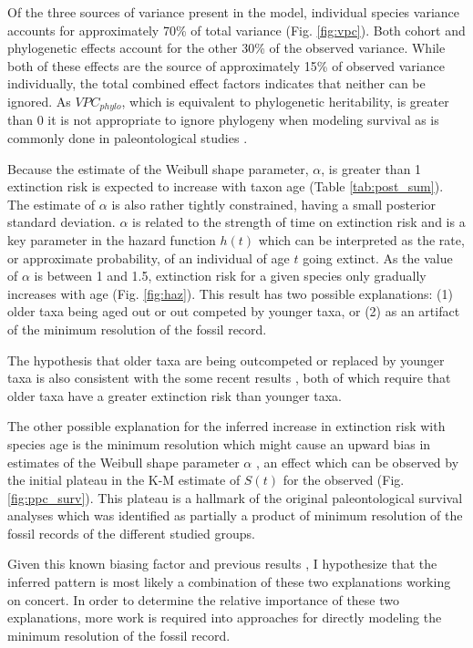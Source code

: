 \documentclass{nature}
\begin{document}
Of the three sources of variance present in the model, individual species variance accounts for approximately 70\% of total variance (Fig. \ref{fig:vpc}). Both cohort and phylogenetic effects account for the other 30\% of the observed variance. While both of these effects are the source of approximately 15\% of observed variance individually, the total combined effect factors indicates that neither can be ignored. As \(VPC_{phylo}\), which is equivalent to phylogenetic heritability, is greater than 0 it is not appropriate to ignore phylogeny when modeling survival \cite{Housworth2004} as is commonly done in paleontological studies \cite{Alroy2009,Foote2013,Jablonski2006a,Hunt2007a,Liow2008,Payne2007}. 

Because the estimate of the Weibull shape parameter, \(\alpha\), is greater than 1 extinction risk is expected to increase with taxon age (Table \ref{tab:post_sum}). The estimate of \(\alpha\) is also rather tightly constrained, having a small posterior standard deviation. \(\alpha\) is related to the strength of time on extinction risk and is a key parameter in the hazard function \(h(t)\) which can be interpreted as the rate, or approximate probability, of an individual of age \(t\) going extinct. As the value of \(\alpha\) is between 1 and 1.5, extinction risk for a given species only gradually increases with age (Fig. \ref{fig:haz}). This result has two possible explanations: (1) older taxa being aged out or out competed by younger taxa, or (2) as an artifact of the minimum resolution of the fossil record.

The hypothesis that older taxa are being outcompeted or replaced by younger taxa is also consistent with the some recent results \cite{Wagner2014b,Quental2013}, both of which require that older taxa have a greater extinction risk than younger taxa.

The other possible explanation for the inferred increase in extinction risk with species age is the minimum resolution which might cause an upward bias in estimates of the Weibull shape parameter \(\alpha\) \cite{Sepkoski1975}, an effect which can be observed by the initial plateau in the K-M estimate of \(S(t)\) for the observed (Fig. \ref{fig:ppc_surv}). This plateau is a hallmark of the original paleontological survival analyses \cite{VanValen1973} which was identified as partially a product of minimum resolution of the fossil records of the different studied groups.

Given this known biasing factor and previous results \cite{Wagner2014b,Quental2013}, I hypothesize that the inferred pattern is most likely a combination of these two explanations working on concert. In order to determine the relative importance of these two explanations, more work is required into approaches for directly modeling the minimum resolution of the fossil record.
\end{document}
